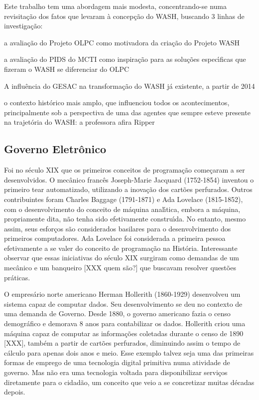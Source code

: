 \documentclass[
12pt,		%
openright,	%
twoside,  %
a4paper,			%
chapter=TITLE,		%
english,			%
french,				%
spanish,			%
brazil				%
]{USPSC-classe/USPSC}
\begin{document}
Este trabalho tem uma abordagem mais modesta, concentrando-se numa revisita\c{c}\~ao dos fatos que levaram \`a concep\c{c}\~ao do WASH, buscando 3 linhas de investiga\c{c}\~ao:






\begin{alineas}
\item a avalia\c{c}\~ao do Projeto OLPC como motivadora da cria\c{c}\~ao do Projeto WASH
\item a avalia\c{c}\~ao do PIDS do MCTI como inspira\c{c}\~ao para as solu\c{c}\~oes espec\'{\i}ficas que fizeram o WASH se diferenciar do OLPC
\item A influ\^encia do GESAC na transforma\c{c}\~ao do WASH j\'a existente, a partir de 2014
\item o contexto hist\'orico mais amplo, que influenciou todos os acontecimentos, principalmente sob a perspectiva de uma das agentes que sempre esteve presente na trajet\'oria do WASH: a professora afira Ripper
\end{alineas}

\subsection[Governo Eletr\^onico]{Governo Eletr\^onico}\label{Governo Eletr\^onico}
Foi no s\'eculo XIX que os primeiros conceitos de programa\c{c}\~ao come\c{c}aram a ser desenvolvidos. O mec\^anico franc\^es Joseph-Marie Jacquard (1752-1854) inventou o primeiro tear automatizado, utilizando a inova\c{c}\~ao dos cart\~oes perfurados. Outros contribuintes foram Charles Baggage (1791-1871) e Ada Lovelace (1815-1852), com o desenvolvimento do conceito de m\'aquina anal\'{\i}tica, embora a m\'aquina, propriamente dita, n\~ao tenha sido efetivamente constru\'{\i}da. No entanto, mesmo assim, seus esfor\c{c}os s\~ao considerados basilares para o desenvolvimento dos primeiros computadores. Ada Lovelace foi considerada a primeira pessoa efetivamente a se valer do conceito de programa\c{c}\~ao na Hist\'oria. Interessante observar que essas iniciativas do s\'eculo XIX surgiram como demandas de um mec\^anico e um banqueiro [XXX quem s\~ao?] que buscavam resolver quest\~oes pr\'aticas.


O empres\'ario norte americano Herman Hollerith (1860-1929) desenvolveu um sistema capaz de computar dados. Seu desenvolvimento se deu no contexto de uma demanda de Governo. Desde 1880, o governo americano fazia o censo demogr\'afico e demorava 8 anos para contabilizar os dados. Hollerith criou uma m\'aquina capaz de computar as informa\c{c}\~oes coletadas durante o censo de 1890 [XXX], tamb\'em a partir de cart\~oes perfurados, diminuindo assim o tempo de c\'alculo para apenas dois anos e meio. Esse exemplo talvez seja uma das primeiras formas de emprego de uma tecnologia digital primitiva numa atividade de governo. Mas n\~ao era uma tecnologia voltada para disponibilizar servi\c{c}os diretamente para o cidad\~ao, um conceito que veio a se concretizar muitas d\'ecadas depois.
\end{document}
